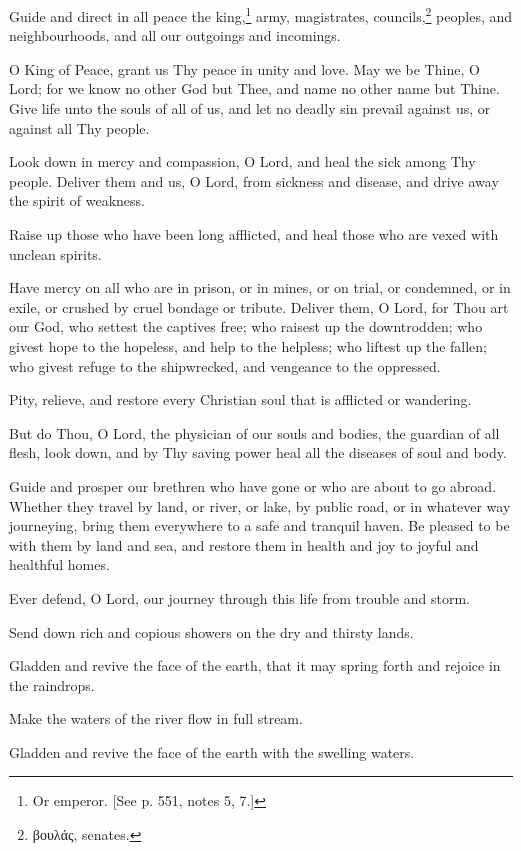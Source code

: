 Guide and direct in all peace the king,\footnote{\par  Or emperor. [See p. 551, notes 5, 7.]} army, magistrates, councils,\footnote{\par  \textgreek{βουλάς}, senates.} peoples, and neighbourhoods, and all our outgoings and incomings.

O King of Peace, grant us Thy peace in unity and love. May we be Thine, O Lord; for we know no other God but Thee, and name no other name but Thine. Give life unto the souls of all of us, and let no deadly sin prevail against us, or against all Thy people.

Look down in mercy and compassion, O Lord, and heal the sick among Thy people. Deliver them and us, O Lord, from sickness and disease, and drive away the spirit of weakness.

Raise up those who have been long afflicted, and heal those who are vexed with unclean spirits.

Have mercy on all who are in prison, or in mines, or on trial, or condemned, or in exile, or crushed by cruel bondage or tribute. Deliver them, O Lord, for Thou art our God, who settest the captives free; who raisest up the downtrodden; who givest hope to the hopeless, and help to the helpless; who liftest up the fallen; who givest refuge to the shipwrecked, and vengeance to the oppressed.

Pity, relieve, and restore every Christian soul that is afflicted or wandering.

But do Thou, O Lord, the physician of our souls and bodies, the guardian of all flesh, look down, and by Thy saving power heal all the diseases of soul and body.

Guide and prosper our brethren who have gone or who are about to go abroad. Whether they travel by land, or river, or lake, by public road, or in whatever way journeying, bring them everywhere to a safe and tranquil haven. Be pleased to be with them by land and sea, and restore them in health and joy to joyful and healthful homes.

Ever defend, O Lord, our journey through this life from trouble and storm.

Send down rich and copious showers on the dry and thirsty lands.

Gladden and revive the face of the earth, that it may spring forth and rejoice in the raindrops.

Make the waters of the river flow in full stream.

Gladden and revive the face of the earth with the swelling waters.

